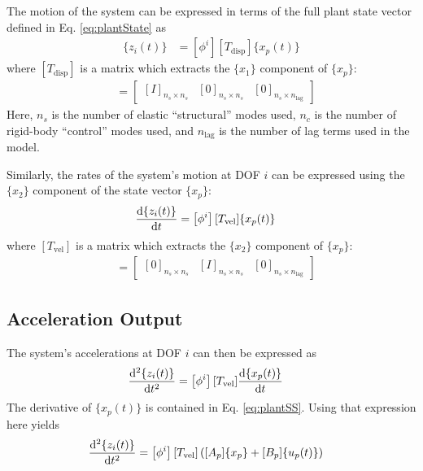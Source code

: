 The motion of the system can be expressed in terms of the full plant state vector defined in Eq. \ref{eq:plantState} as
\begin{align}
	\label{eq:positionOut}
	\{z_i(t)\} &= \left[ \phi^i \right] [T_\text{disp}] \{x_p(t)\}
\end{align}
where $[T_\text{disp}]$ is a matrix which extracts the $\{x_1\}$ component of $\{x_p\}$:
\begin{align}
	[T_\text{disp}] &= \begin{bmatrix} [I]_{n_s \times n_s} & [0]_{n_s \times n_s} & [0]_{n_s \times n_\text{lag}} \end{bmatrix}
\end{align}
Here, $n_s$ is the number of elastic ``structural'' modes used, $n_c$ is the number of rigid-body ``control'' modes used, and $n_\text{lag}$ is the number of lag terms used in the model.

Similarly, the rates of the system's motion at DOF $i$ can be expressed using the $\{x_2\}$ component of the state vector $\{x_p\}$:
\begin{align}
	\label{eq:velocityOut}
	\frac{\mathrm{d} \{z_i(t)\}}{\mathrm{d} t} &= \left[ \phi^i \right] [T_\text{vel}] \{x_p(t)\}
\end{align}
where $[T_\text{vel}]$ is a matrix which extracts the $\{x_2\}$ component of $\{x_p\}$:
\begin{align}
	[T_\text{vel}] &= \begin{bmatrix} [0]_{n_s \times n_s} & [I]_{n_s \times n_s} & [0]_{n_s \times n_\text{lag}} \end{bmatrix}
\end{align}

\subsection{Acceleration Output} %

The system's accelerations at DOF $i$ can then be expressed as
\begin{align}
	\frac{\mathrm{d} ^2\{z_i(t)\}}{\mathrm{d} t^2} &= \left[ \phi^i \right] [T_\text{vel}] \frac{\mathrm{d} \{x_p(t)\}}{\mathrm{d} t}
\end{align}
The derivative of $\{x_p(t)\}$ is contained in Eq. \ref{eq:plantSS}. Using that expression here yields
\begin{align}
	\frac{\mathrm{d} ^2\{z_i(t)\}}{\mathrm{d} t^2} &= \left[ \phi^i \right] [T_\text{vel}]
	\left( [A_p] \{x_p\} + [B_p] \{u_p(t)\} \right)
\end{align}

